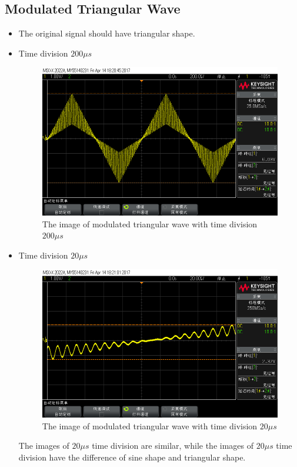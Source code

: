 \documentclass{article}
\begin{document}
\subsection{Modulated Triangular Wave}
\begin{itemize}
\item The original signal should have triangular shape.
\item Time division $200\mu s$ 
\begin{figure}[htbp]
	\centering
		\includegraphics[width=0.7\linewidth]{21.png}
	\caption{The image of modulated triangular wave with time division $200\mu s$}
	\label{fig-2-1}
\end{figure}

\item Time division $20\mu s$ 
\begin{figure}[htbp]
	\centering
		\includegraphics[width=0.7\linewidth]{22.png}
	\caption{The image of modulated triangular wave with time division $20\mu s$}	
	\label{fig-2-2}
\end{figure}
The images of $20\mu s$ time division are similar, while the images of $20\mu s$ time division have the difference of sine shape and triangular shape.
\end{itemize}
\end{document}
